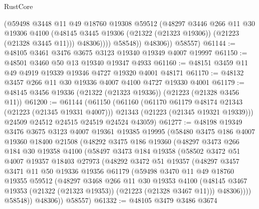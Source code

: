 \begin{lexlean}{RustCore}
\begin{coremodule}
                  (@59498
                    @3448
                    @11
                    @49
                    @18760
                    @19308
                    @59512
                    (@48297
                      @3446
                      @266
                      @11
                      @30
                      @19306
                      @4100
                      (@48145 @3445 @19306 (@21322 (@21323 @19306)) (@21223 (@21328 @3445 @11)))
                      @48306))))
              @58548))
          @48306))
      @58557)
@61144 := @48105 @3461 @3476 @3675 @3123 @19340 @19349 @4007 @19997
@61150 := @48501 @3460 @50 @13 @19340 @19347 @4933
@61160 := @48151 @3459 @11 @49 @4919 @19339 @19346 @4727 @19320 @4001 @48171
@61170 := @48132 @3457 @266 @11 @30 @19336 @4007 @4100 @4727 @19330 @4001
@61179 := @48145 @3456 @19336 (@21322 (@21323 @19336)) (@21223 (@21328 @3456 @11))
@61200 := @61144
    (@61150
      (@61160
        (@61170 @61179 @48174 @21343 (@21223 (@21345 @19331 @4007)))
        @21343
        (@21223 (@21345 @19321 @19339)))
      @24509
      @24512
      @24515
      @24519
      @24524
      @43059)
@61277 := @48198
    @19349
    @3476
    @3675
    @3123
    @4007
    @19361
    @19385
    @19995
    (@58480
      @3475
      @186
      @4007
      @19360
      @18400
      @21508
      (@48292
        @3475
        @186
        @19360
        (@48297
          @3473
          @266
          @184
          @30
          @19358
          @4100
          (@58497
            @3473
            @184
            @19358
            (@58502
              @3472
              @51
              @4007
              @19357
              @18403
              @27973
              (@48292
                @3472
                @51
                @19357
                (@48297
                  @3457
                  @3471
                  @11
                  @50
                  @19336
                  @19356
                  @61179
                  (@59498
                    @3470
                    @11
                    @49
                    @18760
                    @19355
                    @59512
                    (@48297
                      @3468
                      @266
                      @11
                      @30
                      @19353
                      @4100
                      (@48145 @3467 @19353 (@21322 (@21323 @19353)) (@21223 (@21328 @3467 @11)))
                      @48306))))
              @58548))
          @48306))
      @58557)
@61332 := @48105
    @3479
    @3486
    @3674

\end{coremodule}
\end{lexlean}
